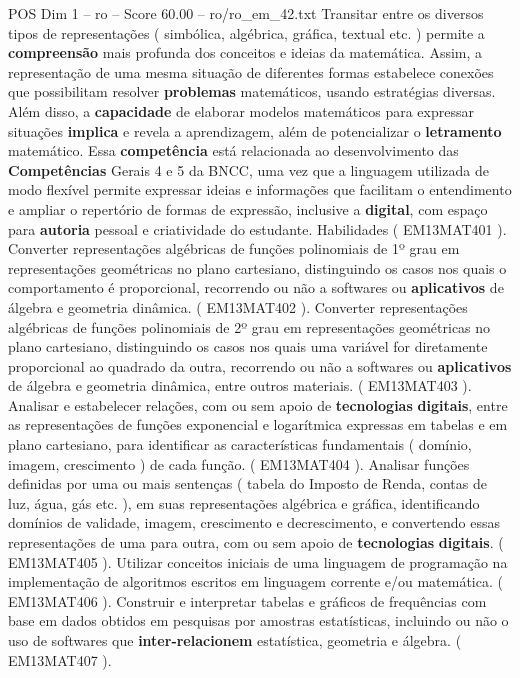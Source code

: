 \begin{textsample}{POS Dim 1 – ro – Score 60.00 – ro/ro\_em\_42.txt}
Transitar entre os diversos tipos de representações ( simbólica, algébrica, gráfica, textual etc. ) permite a \textbf{compreensão} mais profunda dos conceitos e ideias da matemática.
Assim, a representação de uma mesma situação de diferentes formas estabelece conexões que possibilitam resolver \textbf{problemas} matemáticos, usando estratégias diversas.
Além disso, a \textbf{capacidade} de elaborar modelos matemáticos para expressar situações \textbf{implica} e revela a aprendizagem, além de potencializar o \textbf{letramento} matemático.
Essa \textbf{competência} está relacionada ao desenvolvimento das \textbf{Competências} Gerais 4 e 5 da BNCC, uma vez que a linguagem utilizada de modo flexível permite expressar ideias e informações que facilitam o entendimento e ampliar o repertório de formas de expressão, inclusive a \textbf{digital}, com espaço para \textbf{autoria} pessoal e criatividade do estudante.
Habilidades ( EM13MAT401 ).
Converter representações algébricas de funções polinomiais de 1º grau em representações geométricas no plano cartesiano, distinguindo os casos nos quais o comportamento é proporcional, recorrendo ou não a softwares ou \textbf{aplicativos} de álgebra e geometria dinâmica. ( EM13MAT402 ).
Converter representações algébricas de funções polinomiais de 2º grau em representações geométricas no plano cartesiano, distinguindo os casos nos quais uma variável for diretamente proporcional ao quadrado da outra, recorrendo ou não a softwares ou \textbf{aplicativos} de álgebra e geometria dinâmica, entre outros materiais. ( EM13MAT403 ).
Analisar e estabelecer relações, com ou sem apoio de \textbf{tecnologias} \textbf{digitais}, entre as representações de funções exponencial e logarítmica expressas em tabelas e em plano cartesiano, para identificar as características fundamentais ( domínio, imagem, crescimento ) de cada função. ( EM13MAT404 ).
Analisar funções definidas por uma ou mais sentenças ( tabela do Imposto de Renda, contas de luz, água, gás etc. ), em suas representações algébrica e gráfica, identificando domínios de validade, imagem, crescimento e decrescimento, e convertendo essas representações de uma para outra, com ou sem apoio de \textbf{tecnologias} \textbf{digitais}. ( EM13MAT405 ).
Utilizar conceitos iniciais de uma linguagem de programação na implementação de algoritmos escritos em linguagem corrente e/ou matemática. ( EM13MAT406 ).
Construir e interpretar tabelas e gráficos de frequências com base em dados obtidos em pesquisas por amostras estatísticas, incluindo ou não o uso de softwares que \textbf{inter-relacionem} estatística, geometria e álgebra. ( EM13MAT407 ).

\end{textsample}
